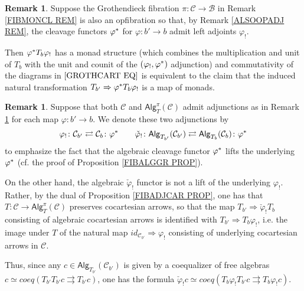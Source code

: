 \documentclass[a4paper,10pt
,draft
]{article}%
\numberwithin{equation}{section}
\numberwithin{figure}{section}
\theoremstyle{definition} %
\newtheorem{remark}[equation]{Remark}%
\newcommand{\1}{\ensuremath{\mathbbm 1}}%
\begin{document}
\begin{remark}\label{ABSPUSH REM}
	Suppose the Grothendieck fibration 
	$\pi \colon \mathcal{C} \to \mathcal{B}$
	in Remark \ref{FIBMONCL REM}
	is also an opfibration so that,
	by Remark \ref{ALSOOPADJ REM},
	the cleavage functors $\varphi^{\**}$ for 
	$\varphi \colon b' \to b$
	admit left adjoints $\varphi_!$.
	
	Then $\varphi^{\**} T_b \varphi_!$ has a monad structure
	(which combines the multiplication and unit of $T_b$ with the unit and counit of the $(\varphi_!,\varphi^{\**})$ adjunction)
	and commutativity of the diagrams in $\eqref{GROTHCART EQ}$
	is equivalent to the claim that the induced natural transformation
	$T_{b'} \Rightarrow \varphi^{\**}T_{b}\varphi_{!}$
	is a map of monads.
\end{remark}



\begin{remark}\label{ALGPUSHLL REM}
	Suppose that both $\mathcal{C}$ and $\mathsf{Alg}_T^{\pi}(\mathcal{C})$
	admit adjunctions as in 
	Remark \ref{ABSPUSH REM} for each map $\varphi \colon b' \to b$.
	We denote these two adjunctions by
	\[
	\varphi_! \colon \mathcal{C}_{b'} 
	\rightleftarrows
	\mathcal{C}_{b}\colon \varphi^{\**}
	\qquad
	\check{\varphi}_! \colon \mathsf{Alg}_{T_{b'}}(\mathcal{C}_{b'}) 
	\rightleftarrows 
	\mathsf{Alg}_{T_{b}}(\mathcal{C}_{b})\colon \varphi^{\**}
	\]
	to emphasize the fact that the algebraic cleavage functor $\varphi^{\**}$ lifts the underlying $\varphi^{\**}$ (cf. the proof of Proposition \ref{FIBALGGR PROP}).
	
	
	On the other hand, the algebraic $\check{\varphi}_!$ functor is not a lift of
	the underlying $\varphi_!$.
	Rather, by the dual of Proposition \ref{FIBADJCAR PROP},
	one has that $T \colon \mathcal{C} \to \mathsf{Alg}_T^{\pi}(\mathcal{C})$ preserves cocartesian arrows,
	so that the map $T_{b'} \Rightarrow \check{\varphi}_! T_{b}$
	consisting of algebraic cocartesian arrows
	is identified with 
	$T_{b'} \Rightarrow T_{b} \varphi_!$,
	i.e. the image under $T$
	of the natural map
	$id_{\mathcal{C}_{b'}} \Rightarrow \varphi_!$
	consisting of underlying cocartesian arrows in $\mathcal{C}$.
	
	
	Thus, since any 
	$c \in \mathsf{Alg}_{T_{b'}}(\mathcal{C}_{b'})$
	is given by a coequalizer of free algebras
	$c \simeq coeq(T_{b'}T_{b'} c \rightrightarrows T_{b'} c)$,
	one has the formula
	$\check{\varphi}_! c \simeq 
	coeq(T_{b}\varphi_!T_{b'} c \rightrightarrows T_{b}\varphi_! c)$.
\end{remark}
\end{document}
